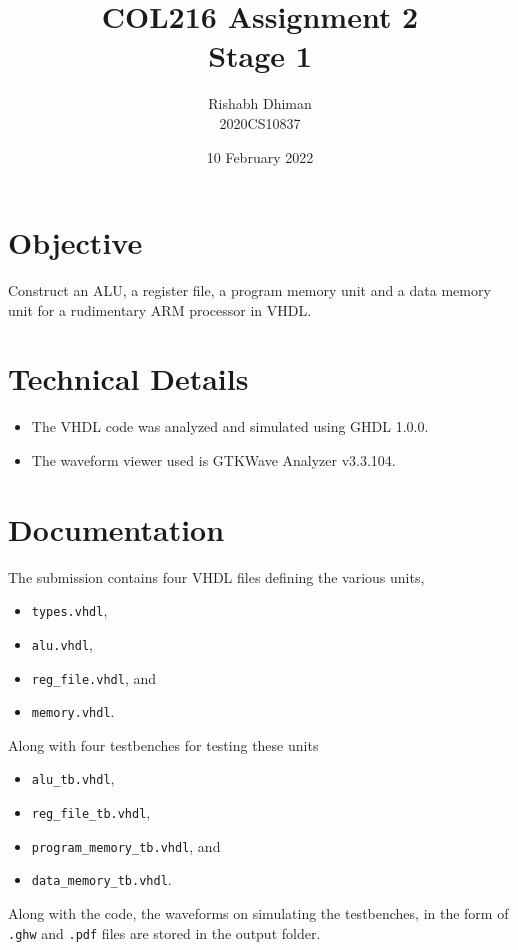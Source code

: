 \documentclass[a4paper]{scrartcl}
\title{COL216 Assignment 2\\{\Large Stage 1}}
\date{10 February 2022}
\author{Rishabh Dhiman\\ 2020CS10837}
\renewcommand{\tt}{\texttt}
\begin{document}
\maketitle

\section{Objective}
Construct an ALU, a register file, a program memory unit and a data memory unit for a rudimentary ARM processor in VHDL.

\section{Technical Details}
\begin{itemize}
	\item The VHDL code was analyzed and simulated using GHDL 1.0.0.
	\item The waveform viewer used is GTKWave Analyzer v3.3.104.
\end{itemize}

\section{Documentation}
The submission contains four VHDL files defining the various units,
\begin{multicols}{2}
	\begin{itemize}
		\item \tt{types.vhdl},
		\item \tt{alu.vhdl},
		\item \tt{reg_file.vhdl}, and
		\item \tt{memory.vhdl}.
	\end{itemize}
\end{multicols}
Along with four testbenches for testing these units
\begin{multicols}{2}
	\begin{itemize}
		\item \tt{alu_tb.vhdl},
		\item \tt{reg_file_tb.vhdl},
		\item \tt{program_memory_tb.vhdl}, and
		\item \tt{data_memory_tb.vhdl}.
	\end{itemize}
\end{multicols}

Along with the code, the waveforms on simulating the testbenches, in the form of \tt{.ghw} and \tt{.pdf} files are stored in the output folder.
\end{document}
